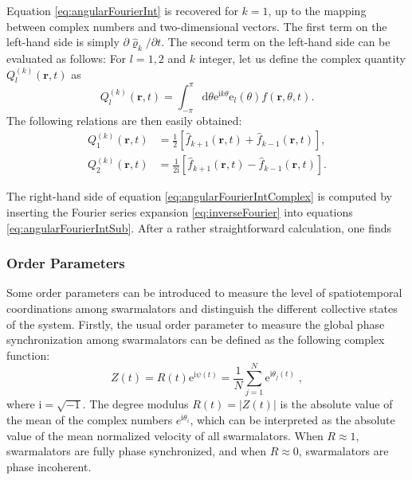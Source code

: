 \documentclass{article}
\begin{document}
Equation \eqref{eq:angularFourierInt} is recovered for $k = 1$, up to the mapping between complex numbers and two-dimensional vectors. The first term on the left-hand side is simply $\partial \hat{\varrho}_k/\partial t$. The second term on the left-hand side can be evaluated as follows: For $l=1,2$ and $k$ integer, let us define the complex quantity $Q_{l}^{\left( k \right)}\left( \mathbf{r},t \right)$ as 
\begin{equation}
    Q_l^{(k)}(\mathbf{r},t)=\int_{-\pi}^\pi\mathrm{d}\theta \mathrm{e}^{\mathrm{i}k\theta}\mathrm{e}_l(\theta)f(\mathbf{r},\theta,t).
\end{equation}
The following relations are then easily obtained:
\begin{equation}
    \begin{aligned}
        Q_{1}^{(k)}(\mathbf{r},t)&=\frac{1}{2}[\hat{f}_{k+1}(\mathbf{r},t)+\hat{f}_{k-1}(\mathbf{r},t)],\\
        Q_{2}^{(k)}(\mathbf{r},t)&=\frac{1}{2\mathrm{i}}[\hat{f}_{k+1}(\mathbf{r},t)-\hat{f}_{k-1}(\mathbf{r},t)].
    \end{aligned}
\end{equation}


The right-hand side of equation \eqref{eq:angularFourierIntComplex} is computed by inserting the Fourier series expansion \eqref{eq:inverseFourier} into equations \eqref{eq:angularFourierIntSub}. After a rather straightforward calculation, one finds


\subsubsection{Order Parameters}
Some order parameters can be introduced to measure the level of spatiotemporal coordinations among swarmalators and distinguish the different collective states of the system. Firstly, the usual order parameter to measure the global phase synchronization among swarmalators can be defined as the following complex function:
\begin{equation}
    Z\left( t \right) =R\left( t \right) \mathrm{e}^{\textrm{i}\psi(t)}=\frac{1}{N}\sum_{j=1}^N{\mathrm{e}^{\textrm{i}\theta _j(t)}}\;,
\end{equation}
where $\textrm{i}=\sqrt{-1}$. The degree modulus $R(t)=\left|Z(t)\right|$ is the absolute value of the mean of the complex numbers $e^{\textrm{i}\theta _i}$, which can be interpreted as the absolute value of the mean normalized velocity of all swarmalators. When $R\approx 1$, swarmalators are fully phase synchronized, and when $R\approx0$, swarmalators are phase incoherent.
\end{document}
